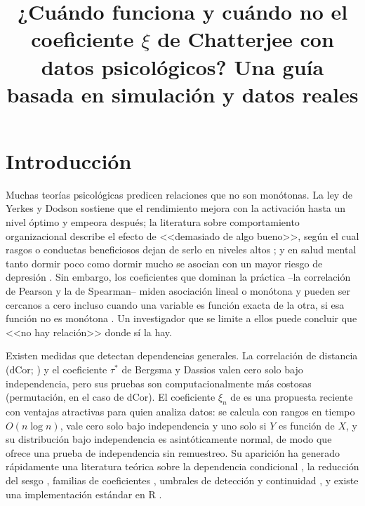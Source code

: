 \documentclass[man,donotrepeattitle,floatsintext]{apa7}
\title{¿Cuándo funciona y cuándo no el coeficiente $\xi$ de Chatterjee con datos psicológicos? Una guía basada en simulación y datos reales}
\begin{document}
\maketitle

\section{Introducción}

Muchas teorías psicológicas predicen relaciones que no son monótonas. La ley de Yerkes y Dodson \parencite{yerkes1908} sostiene que el rendimiento mejora con la activación hasta un nivel óptimo y empeora después; la literatura sobre comportamiento organizacional describe el efecto de <<demasiado de algo bueno>>, según el cual rasgos o conductas beneficiosos dejan de serlo en niveles altos \parencite{pierce2013}; y en salud mental tanto dormir poco como dormir mucho se asocian con un mayor riesgo de depresión \parencite{zhai2015}. Sin embargo, los coeficientes que dominan la práctica --la correlación de Pearson y la de Spearman-- miden asociación lineal o monótona y pueden ser cercanos a cero incluso cuando una variable es función exacta de la otra, si esa función no es monótona \parencite{chatterjee2021}. Un investigador que se limite a ellos puede concluir que <<no hay relación>> donde sí la hay.

Existen medidas que detectan dependencias generales. La correlación de distancia (dCor; \cite{szekely2007}) y el coeficiente $\tau^*$ de Bergsma y Dassios \parencite{bergsma2014} valen cero solo bajo independencia, pero sus pruebas son computacionalmente más costosas (permutación, en el caso de dCor). El coeficiente $\xi_n$ de \textcite{chatterjee2021} es una propuesta reciente con ventajas atractivas para quien analiza datos: se calcula con rangos en tiempo $O(n\log n)$, vale cero solo bajo independencia y uno solo si $Y$ es función de $X$, y su distribución bajo independencia es asintóticamente normal, de modo que ofrece una prueba de independencia sin remuestreo. Su aparición ha generado rápidamente una literatura teórica sobre la dependencia condicional \parencite{azadkia2021}, la reducción del sesgo \parencite{dalitz2024}, familias de coeficientes \parencite{gao2024}, umbrales de detección \parencite{auddy2024} y continuidad \parencite{ansari2026,bucher2025}, y existe una implementación estándar en R \parencite{chatterjee2023xicor}.
\end{document}
